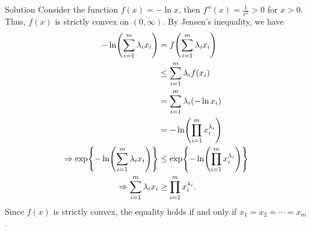 \documentclass{article}
\begin{document}
\begin{solution}
    {Solution}
    Consider the function $f(x)=-\ln x$, then $f''(x)=\frac{1}{x^2}>0$ for $x>0$. Thus, $f(x)$ is strictly convex on $(0,\infty)$. By Jensen's inequality, we have {
        \begin{align*}
            -\ln\parens*{\sum_{i=1}^{m}\lambda_ix_i}
            &= f\parens*{\sum_{i=1}^{m}\lambda_ix_i}\\
            &\leq \sum_{i=1}^{m}\lambda_i f(x_i)\\
            &= \sum_{i=1}^{m}\lambda_i(-\ln x_i)\\
            &= -\ln\parens*{\prod_{i=1}^{m}x_i^{\lambda_i}} \\
            \Rightarrow
            \exp\braces*{-\ln\parens*{\sum_{i=1}^{m}\lambda_ix_i}}
            &\leq \exp\braces*{-\ln\parens*{\prod_{i=1}^{m}x_i^{\lambda_i}}}\\
            \Rightarrow
            \sum_{i=1}^{m}\lambda_ix_i &\geq \prod_{i=1}^{m}x_i^{\lambda_i}.
        \end{align*}
    }
    Since $f(x)$ is strictly convex, the equality holds if and only if $x_1=x_2=\cdots=x_m$.
\end{solution}
\end{document}
